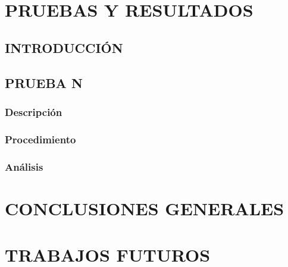 \newpage
\chapter{PRUEBAS Y RESULTADOS}

\section{INTRODUCCIÓN}

\section{PRUEBA N}
\subsection{Descripción}
\subsection{Procedimiento}
\subsection{Análisis}

\newpage

\chapter{CONCLUSIONES GENERALES}

\chapter{TRABAJOS FUTUROS}





